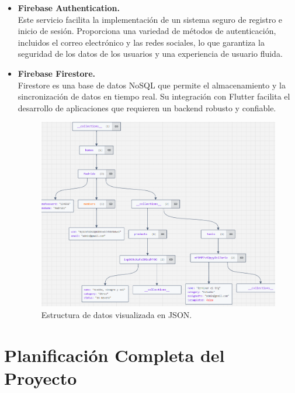 \documentclass{article}
\begin{document}
\begin{flushleft}
        \begin{itemize}
            \item \textbf{Firebase Authentication.} \\
            Este servicio facilita la implementación de un sistema seguro de registro e inicio de sesión. Proporciona una variedad de métodos de autenticación, incluidos el correo electrónico y las redes sociales, lo que garantiza la seguridad de los datos de los usuarios y una experiencia de usuario fluida.
            \item \textbf{Firebase Firestore.} \\
            Firestore es una base de datos NoSQL que permite el almacenamiento y la sincronización de datos en tiempo real. Su integración con Flutter facilita el desarrollo de aplicaciones que requieren un backend robusto y confiable.


\begin{figure}[H]
    \centering
    \includegraphics[width=1.1\textwidth, height=0.8\textheight]{TFG/img/json.png}
    \caption{Estructura de datos visualizada en JSON.}
    \label{fig:json_structure}
\end{figure}
        \end{itemize}

                

     

   \section{Planificaci\'on Completa del Proyecto}


\end{flushleft}
\end{document}
